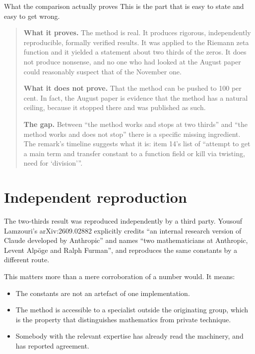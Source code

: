 \begin{deeper}{What the comparison actually proves}
This is the part that is easy to state and easy to get wrong.

\begin{quote}
\textbf{What it proves.} The method is real. It produces rigorous,
independently reproducible, formally verified results. It was applied to the
Riemann zeta function and it yielded a statement about two thirds of the
zeros. It does not produce nonsense, and no one who had looked at the August
paper could reasonably suspect that of the November one.

\textbf{What it does not prove.} That the method can be pushed to 100 per
cent. In fact, the August paper is evidence that the method has a natural
ceiling, because it stopped there and was published as such.

\textbf{The gap.} Between ``the method works and stops at two thirds'' and
``the method works and does not stop'' there is a specific missing ingredient.
The remark's timeline suggests what it is: item 14's list of ``attempt to get
a main term and transfer constant to a function field or kill via twisting,
need for `division'''.
\end{quote}
\end{deeper}

\section{Independent reproduction}The two-thirds result was reproduced independently by a third party. Yousouf
Lamzouri's arXiv:2609.02882 explicitly credits ``an internal research version
of Claude developed by Anthropic'' and names ``two mathematicians at
Anthropic, Levent Alpöge and Ralph Furman'', and reproduces the same constants
by a different route.

This matters more than a mere corroboration of a number would. It means:

\begin{itemize}
\item The constants are not an artefact of one implementation.
\item The method is accessible to a specialist outside the originating group,
which is the property that distinguishes mathematics from private technique.
\item Somebody with the relevant expertise has already read the machinery, and
has reported agreement.
\end{itemize}

